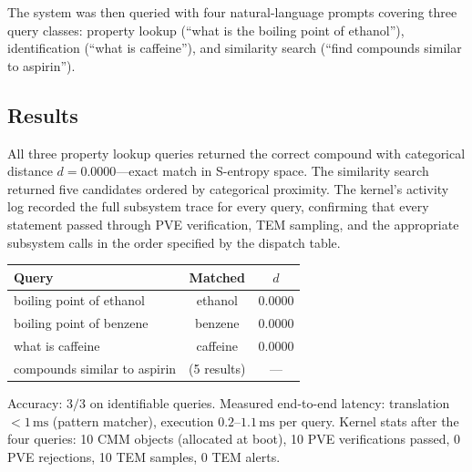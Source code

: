 \documentclass[11pt,twocolumn,a4paper]{article}
\begin{document}
The system was then queried with four natural-language prompts covering three query classes: property lookup (``what is the boiling point of ethanol''), identification (``what is caffeine''), and similarity search (``find compounds similar to aspirin'').

\subsection{Results}

All three property lookup queries returned the correct compound with categorical distance $d = 0.0000$---exact match in S-entropy space. The similarity search returned five candidates ordered by categorical proximity. The kernel's activity log recorded the full subsystem trace for every query, confirming that every statement passed through PVE verification, TEM sampling, and the appropriate subsystem calls in the order specified by the dispatch table.

\begin{center}
\begin{tabular}{lcc}
\toprule
\textbf{Query} & \textbf{Matched} & \textbf{$d$} \\
\midrule
boiling point of ethanol & ethanol & 0.0000 \\
boiling point of benzene & benzene & 0.0000 \\
what is caffeine & caffeine & 0.0000 \\
compounds similar to aspirin & (5 results) & --- \\
\bottomrule
\end{tabular}
\end{center}

Accuracy: $3/3$ on identifiable queries. Measured end-to-end latency: translation $< 1\,\text{ms}$ (pattern matcher), execution $0.2$--$1.1\,\text{ms}$ per query. Kernel stats after the four queries: 10 CMM objects (allocated at boot), 10 PVE verifications passed, 0 PVE rejections, 10 TEM samples, 0 TEM alerts.
\end{document}
